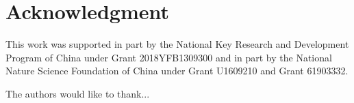 \documentclass[journal]{IEEEtran}
\begin{document}
\section*{Acknowledgment}
This work was supported in part by the National Key Research and Development Program of China under Grant 2018YFB1309300 and in part by the National Nature Science Foundation of China under Grant U1609210 and Grant 61903332. 

The authors would like to thank...



\ifCLASSOPTIONcaptionsoff
  \newpage
\fi





%
%
%
%
%

% 
\end{document}
